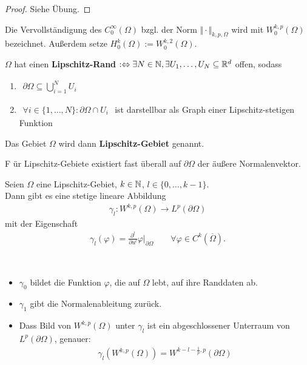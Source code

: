 \begin{proof}
	Siehe Übung.
\end{proof}

\begin{definition}
	Die Vervollständigung des $C_0^\infty(\Omega)$ bzgl. der Norm $\Vert\cdot\Vert_{k,p,\Omega}$ wird mit $W_0^{k,p}(\Omega)$ bezeichnet.
	Außerdem setze $H_0^k(\Omega):=W_0^{k,2}(\Omega)$.
\end{definition}

\begin{definition}\enter
	$\Omega$ hat einen \textbf{Lipschitz-Rand} $:\Leftrightarrow\exists N\in\mathbb{N},\exists U_1,\ldots,U_N\subseteq\mathbb{R}^d$ offen, sodass
	\begin{enumerate}
		\item $\begin{aligned}
			\partial\Omega\subseteq\bigcup\limits^N_{i=1} U_i
		\end{aligned}$
		\item $\begin{aligned}
			\forall i\in\lbrace1,\ldots,N\rbrace:\partial\Omega\cap U_i
		\end{aligned}$
		ist darstellbar als Graph einer Lipschitz-stetigen Funktion
	\end{enumerate}
	Das Gebiet $\Omega$ wird dann \textbf{Lipschitz-Gebiet} genannt.
\end{definition}

\begin{bemerkung}
F	ür Lipschitz-Gebiete existiert fast überall auf $\partial\Omega$ der äußere Normalenvektor.
\end{bemerkung}

\begin{satz}[Spursatz]\label{satz1.7Spursatz}\enter
	Seien $\Omega$ eine Lipschitz-Gebiet, $k\in\mathbb{N}$, $l\in\lbrace 0,\ldots,k-1\rbrace$.\\
	Dann gibt es eine stetige lineare Abbildung
	\begin{align*}
		\gamma_l:W^{k,p}(\Omega)\rightarrow L^p(\partial\Omega)
	\end{align*}
	mit der Eigenschaft
	\begin{align*}
		\gamma_l(\varphi)=\frac{\partial^l}{\partial u^l}\varphi|_{\partial\Omega}\qquad\forall\varphi\in C^k(\overline{\Omega}).
	\end{align*}
\end{satz}

\begin{bemerkung}\
	\begin{itemize}
		\item $\gamma_0$ bildet die Funktion $\varphi$, die auf $\Omega$ lebt, auf ihre Randdaten ab.
		\item  $\gamma_1$ gibt die Normalenableitung zurück.
		\item Dass Bild von $W^{k,p}(\Omega)$ unter $\gamma_l$ ist ein abgeschlossener Unterraum von $L^p(\partial\Omega)$, genauer:
		\begin{align*}
			\gamma_l\left(W^{k,p}(\Omega)\right)=W^{k-l-\frac{1}{p},p}(\partial\Omega)
		\end{align*}
	\end{itemize}
\end{bemerkung}

